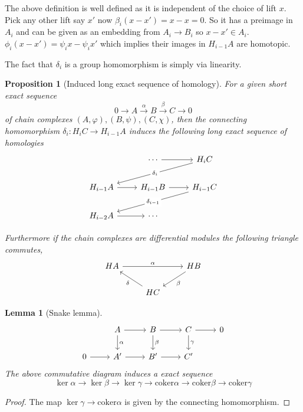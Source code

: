 \documentclass[12pt]{article}
\numberwithin{equation}{section}
\newcounter{dummy} \numberwithin{dummy}{section}
\newtheorem{lemma}[dummy]{Lemma}
\newtheorem{proposition}[dummy]{Proposition}
\begin{document}
\begin{appendices}
	The above definition is well defined as it is independent of the choice of lift $x$. Pick any other lift say $x'$ now $\beta_i(x-x')=x-x=0$. So it has a preimage in $A_i$ and can be given as an embedding from $A_i \to B_i$ so $x-x' \in A_i$. $\phi_i(x-x')=\psi_i x - \psi_i x'$ which implies their images in $H_{i-1}A$ are homotopic.
	
	The fact that $\delta_i $ is a group homomorphism is simply via linearity.
	
	\begin{proposition}[Induced long exact sequence of homology]
		For a given short exact sequence 
		\[ 0 \to A \xrightarrow{\alpha } B \xrightarrow{\beta } C \to 0\]
		of chain complexes $(A, \varphi), (B, \psi), (C, \chi)$, then the connecting homomorphism $\delta_i: H_iC \to H_{i-1}A$ induces the following long exact sequence of homologies
		\[\begin{tikzcd}
			& \cdots & {H_iC} \\
			{H_{i-1}A} & {H_{i-1}B} & {H_{i-1}C} \\
			{H_{i-2}A} & \cdots
			\arrow[from=1-2, to=1-3]
			\arrow[from=2-1, to=2-2]
			\arrow[from=2-2, to=2-3]
			\arrow["{\delta_i}"{description}, from=1-3, to=2-1]
			\arrow["{\delta_{i-1}}"{description}, from=2-3, to=3-1]
			\arrow[from=3-1, to=3-2]
		\end{tikzcd}\]
		
		Furthermore if the chain complexes are differential modules the following triangle commutes,
		\[\begin{tikzcd}
			HA && HB \\
			& HC
			\arrow["\alpha", from=1-1, to=1-3]
			\arrow["\beta", from=1-3, to=2-2]
			\arrow["\delta", from=2-2, to=1-1]
		\end{tikzcd}\]
		
	\end{proposition}
	
		\begin{lemma}[Snake lemma]
		\[\begin{tikzcd}
			& A & B & C & 0 \\
			0 & {A'} & {B'} & {C'}
			\arrow[from=1-2, to=1-3]
			\arrow[from=1-3, to=1-4]
			\arrow[from=1-4, to=1-5]
			\arrow[from=2-1, to=2-2]
			\arrow[from=2-2, to=2-3]
			\arrow[from=2-3, to=2-4]
			\arrow["\alpha", from=1-2, to=2-2]
			\arrow["\beta", from=1-3, to=2-3]
			\arrow["\gamma", from=1-4, to=2-4]
		\end{tikzcd}\]
		The above commutative diagram induces a exact sequence \[ \ker \alpha \to \ker \beta \to \ker \gamma \to \mathrm{coker}\alpha \to \mathrm{coker}\beta \to \mathrm{coker}\gamma \]
	\end{lemma}
	\begin{proof}
		The map $\ker \gamma \to \mathrm{coker} \alpha $ is given by the connecting homomorphism.
	\end{proof}
	

\end{appendices}
\end{document}
